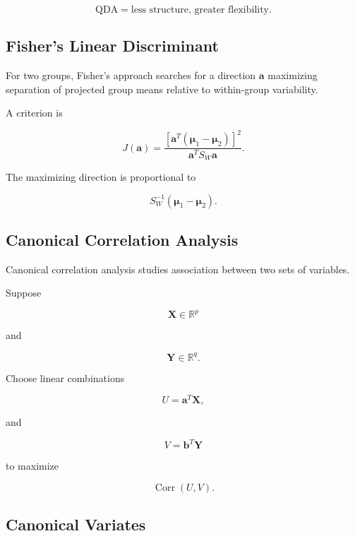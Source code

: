 \[
\boxed{
\text{QDA}
=
\text{less structure, greater flexibility}.
}
\]

\subsection{Fisher's Linear Discriminant}
\label{subsec:fisher-linear-discriminant}

For two groups, Fisher's approach searches for a direction
\(\mathbf{a}\) maximizing separation of projected group means relative to
within-group variability.

A criterion is

\[
\boxed{
J(\mathbf{a})
=
\frac{
[
\mathbf{a}^T
(
\boldsymbol{\mu}_1-\boldsymbol{\mu}_2
)
]^2
}{
\mathbf{a}^T
S_W
\mathbf{a}
}.
}
\]

The maximizing direction is proportional to

\[
\boxed{
S_W^{-1}
(
\boldsymbol{\mu}_1-\boldsymbol{\mu}_2
).
}
\]

\subsection{Canonical Correlation Analysis}
\label{subsec:canonical-correlation-analysis}

Canonical correlation analysis studies association between two sets of
variables.

Suppose

\[
\mathbf{X}\in\mathbb{R}^p
\]

and

\[
\mathbf{Y}\in\mathbb{R}^q.
\]

Choose linear combinations

\[
\boxed{
U
=
\mathbf{a}^T\mathbf{X},
}
\]

and

\[
\boxed{
V
=
\mathbf{b}^T\mathbf{Y}
}
\]

to maximize

\[
\boxed{
\operatorname{Corr}(U,V).
}
\]

\subsection{Canonical Variates}
\label{subsec:canonical-variates}

